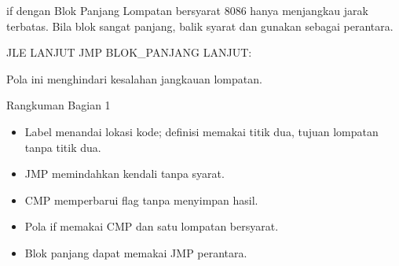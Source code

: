 \documentclass[aspectratio=169,11pt]{beamer}
\begin{document}
\begin{frame}[fragile]{if dengan Blok Panjang}
\small
Lompatan bersyarat 8086 hanya menjangkau jarak terbatas. Bila blok
 sangat panjang, balik syarat dan gunakan  sebagai
perantara.

\vspace{0.2em}
\begin{kodeasm}[numbers=none]
JLE LANJUT
JMP BLOK_PANJANG
LANJUT:
\end{kodeasm}

\vspace{0.15em}
{\footnotesize\color{obeGray}Pola ini menghindari kesalahan jangkauan
lompatan.\par}
\end{frame}

\begin{frame}{Rangkuman Bagian 1}
\small
\begin{itemize}
    \item Label menandai lokasi kode; definisi memakai titik dua,
          tujuan lompatan tanpa titik dua.

    \vspace{0.15em}
    \item JMP memindahkan kendali tanpa syarat.

    \vspace{0.15em}
    \item CMP memperbarui flag tanpa menyimpan hasil.

    \vspace{0.15em}
    \item Pola if memakai CMP dan satu lompatan bersyarat.

    \vspace{0.15em}
    \item Blok panjang dapat memakai JMP perantara.
\end{itemize}
\end{frame}

\end{document}

